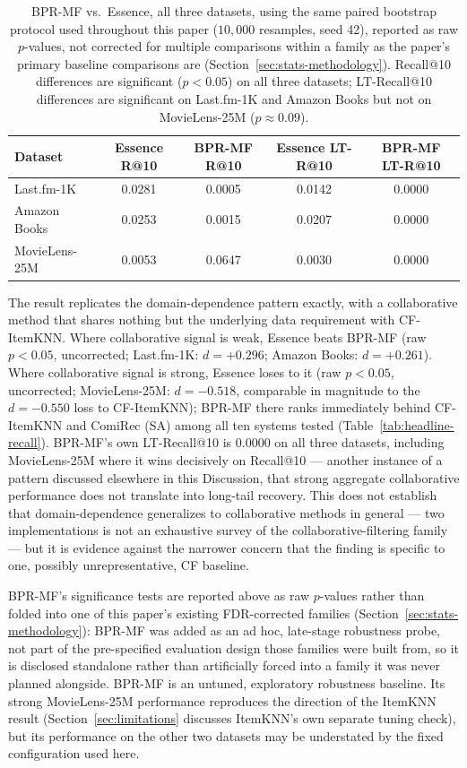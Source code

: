 \documentclass[11pt,a4paper]{article}
\begin{document}
\begin{table}[H]
\centering
\caption{BPR-MF vs.\ Essence, all three datasets, using the same paired
         bootstrap protocol used throughout this paper ($10{,}000$
         resamples, seed 42), reported as raw $p$-values, not corrected
         for multiple comparisons within a family as the paper's primary
         baseline comparisons are (Section~\ref{sec:stats-methodology}).
         Recall@10 differences are significant ($p<0.05$) on all three
         datasets; LT-Recall@10 differences are significant on Last.fm-1K
         and Amazon Books but not on MovieLens-25M ($p\approx0.09$).}
\label{tab:bprmf}
\begin{tabular}{lcccc}
\toprule
\textbf{Dataset} & \textbf{Essence R@10} & \textbf{BPR-MF R@10} & \textbf{Essence LT-R@10} & \textbf{BPR-MF LT-R@10} \\
\midrule
Last.fm-1K     & 0.0281 & 0.0005 & 0.0142 & 0.0000 \\
Amazon Books   & 0.0253 & 0.0015 & 0.0207 & 0.0000 \\
MovieLens-25M  & 0.0053 & 0.0647 & 0.0030 & 0.0000 \\
\bottomrule
\end{tabular}
\end{table}

The result replicates the domain-dependence pattern exactly, with a
collaborative method that shares nothing but the underlying data
requirement with CF-ItemKNN. Where collaborative signal is weak,
Essence beats BPR-MF (raw $p<0.05$, uncorrected; Last.fm-1K: $d=+0.296$;
Amazon Books: $d=+0.261$). Where collaborative signal is strong, Essence
loses to it (raw $p<0.05$, uncorrected; MovieLens-25M: $d=-0.518$, comparable in
magnitude to the $d=-0.550$ loss to CF-ItemKNN); BPR-MF there ranks
immediately behind CF-ItemKNN and ComiRec (SA) among all ten systems
tested (Table~\ref{tab:headline-recall}). BPR-MF's own LT-Recall@10 is
$0.0000$ on all three datasets, including MovieLens-25M where it wins
decisively on Recall@10 --- another instance of a pattern discussed
elsewhere in this Discussion, that strong aggregate collaborative
performance does not translate into long-tail recovery. This does not
establish that domain-dependence generalizes to collaborative methods in
general --- two implementations is not an exhaustive survey of the
collaborative-filtering family --- but it is evidence against the
narrower concern that the finding is specific to one, possibly
unrepresentative, CF baseline.

BPR-MF's significance tests are reported above as raw $p$-values rather
than folded into one of this paper's existing FDR-corrected families
(Section~\ref{sec:stats-methodology}): BPR-MF was added as an ad hoc,
late-stage robustness probe, not part of the pre-specified evaluation
design those families were built from, so it is disclosed standalone
rather than artificially forced into a family it was never planned
alongside. BPR-MF is an untuned, exploratory robustness baseline. Its
strong MovieLens-25M performance reproduces the direction of the
ItemKNN result (Section~\ref{sec:limitations} discusses ItemKNN's own
separate tuning check), but its performance on the other two datasets
may be understated by the fixed configuration used here.
\end{document}
